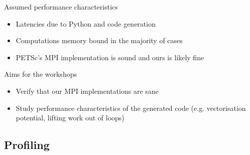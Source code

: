 \documentclass[pdf,aspectratio=169]{beamer}
\begin{document}
\begin{frame}{Assumed performance characteristics}

  \begin{itemize}
    \item Latencies due to Python and code generation
    \item Computations memory bound in the majority of cases
    \item PETSc's MPI implementation is sound and ours is likely fine
  \end{itemize}

\end{frame}

\begin{frame}{Aims for the workshops}

  \begin{itemize}
    \item Verify that our MPI implementations are sane
    \item Study performance characteristics of the generated code (e.g. vectorisation potential, lifting work out of loops)
  \end{itemize}

\end{frame}


\subsection{Profiling}
\end{document}

